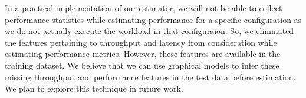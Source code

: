 In a practical implementation of our estimator, we will not be able
to collect performance statistics while estimating performance for
a specific configuration as we do not actually execute the workload
in that configuraion. So, we eliminated the features pertaining to
throughput and latency from consideration while estimating
performance metrics.
However, these features are available in the training dataset.
We believe that we can use graphical models to infer these
missing throughput and performance features in the test data
before estimation. We plan to explore this technique in
future work.